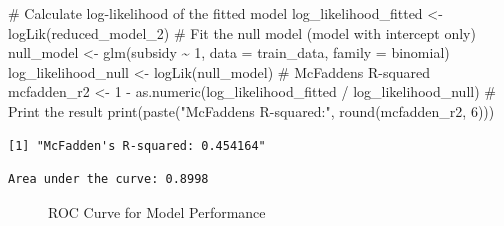 \documentclass[
  letterpaper,
  DIV=11,
  numbers=noendperiod]{scrartcl}
\newenvironment{Shaded}{\begin{snugshade}}{\end{snugshade}}
\newcommand{\AttributeTok}[1]{\textcolor[rgb]{0.40,0.45,0.13}{#1}}
\newcommand{\CommentTok}[1]{\textcolor[rgb]{0.37,0.37,0.37}{#1}}
\newcommand{\DecValTok}[1]{\textcolor[rgb]{0.68,0.00,0.00}{#1}}
\newcommand{\FunctionTok}[1]{\textcolor[rgb]{0.28,0.35,0.67}{#1}}
\newcommand{\NormalTok}[1]{\textcolor[rgb]{0.00,0.23,0.31}{#1}}
\newcommand{\OtherTok}[1]{\textcolor[rgb]{0.00,0.23,0.31}{#1}}
\newcommand{\SpecialCharTok}[1]{\textcolor[rgb]{0.37,0.37,0.37}{#1}}
\newcommand{\StringTok}[1]{\textcolor[rgb]{0.13,0.47,0.30}{#1}}
\begin{document}
\begin{Shaded}
\begin{Highlighting}[]
\CommentTok{\# Calculate log{-}likelihood of the fitted model}
\NormalTok{log\_likelihood\_fitted }\OtherTok{\textless{}{-}} \FunctionTok{logLik}\NormalTok{(reduced\_model\_2)}
\CommentTok{\# Fit the null model (model with intercept only)}
\NormalTok{null\_model }\OtherTok{\textless{}{-}} \FunctionTok{glm}\NormalTok{(subsidy }\SpecialCharTok{\textasciitilde{}} \DecValTok{1}\NormalTok{, }\AttributeTok{data =}\NormalTok{ train\_data, }\AttributeTok{family =}\NormalTok{ binomial)}
\NormalTok{log\_likelihood\_null }\OtherTok{\textless{}{-}} \FunctionTok{logLik}\NormalTok{(null\_model)}
\CommentTok{\# McFadden\textquotesingle{}s R{-}squared}
\NormalTok{mcfadden\_r2 }\OtherTok{\textless{}{-}} \DecValTok{1} \SpecialCharTok{{-}} \FunctionTok{as.numeric}\NormalTok{(log\_likelihood\_fitted }\SpecialCharTok{/}\NormalTok{ log\_likelihood\_null)}
\CommentTok{\# Print the result}
\FunctionTok{print}\NormalTok{(}\FunctionTok{paste}\NormalTok{(}\StringTok{"McFadden\textquotesingle{}s R{-}squared:"}\NormalTok{, }\FunctionTok{round}\NormalTok{(mcfadden\_r2, }\DecValTok{6}\NormalTok{)))}
\end{Highlighting}
\end{Shaded}

\begin{verbatim}
[1] "McFadden's R-squared: 0.454164"
\end{verbatim}

\begin{verbatim}
Area under the curve: 0.8998
\end{verbatim}

\begin{figure}


\caption{\label{fig-roc}ROC Curve for Model Performance}

\end{figure}%
\end{document}
